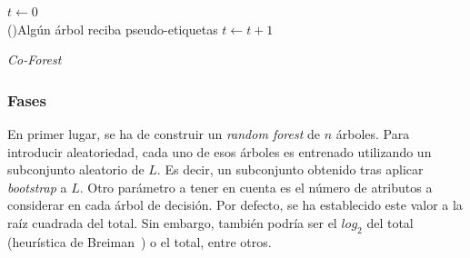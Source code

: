 \begin{algorithm}
	\BlankLine

	$t \leftarrow 0$\\
	\While(){Algún árbol reciba pseudo-etiquetas}{
	$t \leftarrow t + 1$\\
	
}

	\caption{\textit{Co-Forest}}\label{alg:co-forest}
	\end{algorithm}

\subsubsection{Fases}

En primer lugar, se ha de construir un \textit{random forest} de $n$ árboles. Para introducir aleatoriedad, cada uno de esos árboles es entrenado utilizando un subconjunto aleatorio de $L$. Es decir, un subconjunto obtenido tras aplicar \textit{bootstrap} a $L$.
Otro parámetro a tener en cuenta es el número de atributos a considerar en cada árbol de decisión. Por defecto, se ha establecido este valor a la raíz cuadrada del total. Sin embargo, también podría ser el $log_{2}$ del total (heurística de Breiman~\cite{engelen2018thesis}) o el total, entre otros.

